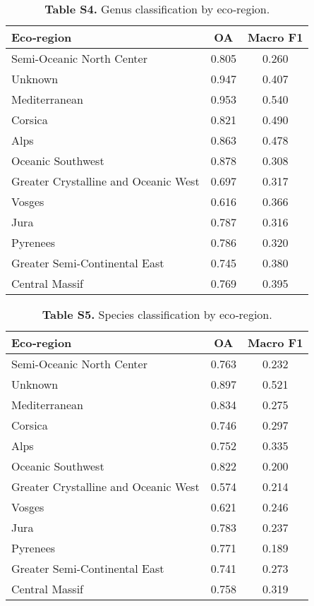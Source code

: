 \documentclass[utf8]{frontiers_suppmat}
\begin{document}
\begin{table}[H]
    \centering
    \caption{\textbf{Table S4.} Genus classification by eco‑region.}
    \begin{tabular}{lcc}
        \hline
        Eco‑region & OA & Macro F1 \\
        \hline
        Semi-Oceanic North Center & 0.805 & 0.260 \\
        Unknown & 0.947 & 0.407 \\
        Mediterranean & 0.953 & 0.540 \\
        Corsica & 0.821 & 0.490 \\
        Alps & 0.863 & 0.478 \\
        Oceanic Southwest & 0.878 & 0.308 \\
        Greater Crystalline and Oceanic West & 0.697 & 0.317 \\
        Vosges & 0.616 & 0.366 \\
        Jura & 0.787 & 0.316 \\
        Pyrenees & 0.786 & 0.320 \\
        Greater Semi-Continental East & 0.745 & 0.380 \\
        Central Massif & 0.769 & 0.395 \\
        \hline
    \end{tabular}
    \label{tab:genus_ecoregion_embeddings}
\end{table}

\begin{table}[H]
    \centering
    \caption{\textbf{Table S5.} Species classification by eco‑region.}
    \begin{tabular}{lcc}
        \hline
        Eco‑region & OA & Macro F1 \\
        \hline
        Semi-Oceanic North Center & 0.763 & 0.232 \\
        Unknown & 0.897 & 0.521 \\
        Mediterranean & 0.834 & 0.275 \\
        Corsica & 0.746 & 0.297 \\
        Alps & 0.752 & 0.335 \\
        Oceanic Southwest & 0.822 & 0.200 \\
        Greater Crystalline and Oceanic West & 0.574 & 0.214 \\
        Vosges & 0.621 & 0.246 \\
        Jura & 0.783 & 0.237 \\
        Pyrenees & 0.771 & 0.189 \\
        Greater Semi-Continental East & 0.741 & 0.273 \\
        Central Massif & 0.758 & 0.319 \\
        \hline
    \end{tabular}
    \label{tab:species_ecoregion_embeddings}
\end{table}
\end{document}
